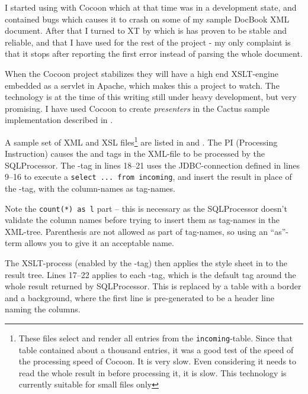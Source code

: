 I started using  with Cocoon
which at that time was in a development state, and contained bugs
which causes it to crash on some of my sample DocBook XML document.
After that I turned to XT by  which is has proven to be stable and reliable, and that I
have used for the rest of the project - my only complaint is that it
stops after reporting the first error instead of parsing the whole
document.


When the Cocoon project stabilizes they will have a
high end XSLT-engine embedded as a servlet in Apache, which makes this
a project to watch.  The technology is at the time of this writing
still under heavy development, but very promising.  I have used Cocoon
to create \textit{presenters} in the Cactus sample implementation
described in .

A sample set of XML and XSL files\footnote{These files select and
  render all entries from the \texttt{incoming}-table.  Since that
  table contained about a thousand entries, it was a good test of the
  speed of the processing speed of Cocoon.  It is very slow.  Even
  considering it needs to read the whole result in before processing
  it, it is slow.  This technology is currently suitable for small
  files only} are listed in 
  and .  The
   PI (Processing Instruction) causes
  the  and  tags in the XML-file to be
  processed by the SQLProcessor.  The -tag in lines 18--21
  uses the JDBC-connection defined in lines 9--16 to execute a
  \texttt{select ... from incoming}, and insert the result in place of
  the -tag, with the column-names as tag-names.

Note the \texttt{count(*) as l} part -- this is necessary as the
SQLProcessor doesn't validate the column names before trying to insert
them as tag-names in the XML-tree.  Parenthesis are not allowed as
part of tag-names, so using an ``as''-term allows you to give it an
acceptable name.

The XSLT-process (enabled by the -tag) then applies the style sheet in
 to the result tree.  Lines
17--22 applies to each -tag, which is the default tag
around the whole result returned by SQLProcessor.  This is replaced
by a table with a border and a background, where the first line is
pre-generated to be a header line naming the columns.

